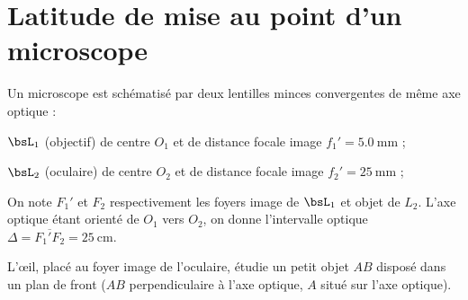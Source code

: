 \documentclass[a4paper,french,bookmarks]{article}
\begin{document}
    \renewcommand{\thesection}{\Roman{section}} 
    \renewcommand{\thesubsection}{\thesection.\Alph{subsection}}
    \renewcommand{\labelenumi}{\thesection.\arabic{enumi}.}
    \renewcommand*{\labelenumii}{\alph{enumii}.}
    \renewcommand*{\labelenumiii}{\alph{enumiii}.}
    
    
    \section{Latitude de mise au point d'un microscope}
    
    Un microscope est schématisé par deux lentilles minces convergentes de même axe optique :
    \begin{enumerate}
        \itt $\bsL_1$ (objectif) de centre $O_1$ et de distance focale image $f_1' = \qty{5.0}{\mm}$ ;
        
        \itt $\bsL_2$ (oculaire) de centre $O_2$ et de distance focale image $f_2' = \qty{25}{\mm}$ ;
    \end{enumerate}
    On note $F_1'$ et $F_2$ respectivement les foyers image de $\bsL_1$ et objet de $L_2$. L'axe optique étant orienté de $O_1$ vers $O_2$, on donne l'intervalle optique $\Delta = \overline{F_1'F_2} = \qty{25}{\cm}$.
    
    L'\oe{}il, placé au foyer image de l'oculaire, étudie un petit objet $AB$ disposé dans un plan de front ($AB$ perpendiculaire à l'axe optique, $A$ situé sur l'axe optique).
    
\end{document}
